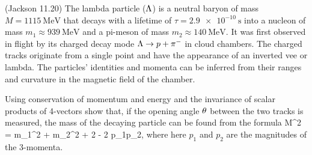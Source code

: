 \newcommand{\mq}{m_1}
\newcommand{\mw}{m_2}
\newcommand{\pq}{p_1}
\newcommand{\pw}{p_2}

\newcommand{\mLam}{\SI{1115}{\MeV}}
\newcommand{\tauLam}{\SI{2.9e-10}{\second}}
\newcommand{\mnuc}{\SI{939}{\MeV}}
\newcommand{\mpi}{\SI{140}{\MeV}}

\begin{statement}{(Jackson 11.20)}
	The lambda particle ($\Lambda$) is a neutral baryon of mass $M = \mLam$ that decays with a lifetime of $\tau = \tauLam$ into a nucleon of mass $\mq \approx \mnuc$ and a pi-meson of mass $\mw \approx \mpi$.  It was first observed in flight by its charged decay mode $\Lambda \to p + \pi^-$ in cloud chambers.  The charged tracks originate from a single point and have the appearance of an inverted vee or lambda.  The particles' identities and momenta can be inferred from their ranges and curvature in the magnetic field of the chamber.
\end{statement}

\newcommand{\Pq}{P_1}
\newcommand{\Pw}{P_2}

\newcommand{\Pmu}{P^\mu}
\newcommand{\Psmu}{P_\mu}
\newcommand{\Pqmu}{{\Pq}^\mu}
\newcommand{\Pqsmu}{{\Pq}_\mu}
\newcommand{\Pwmu}{{\Pw}^\mu}
\newcommand{\Pwsmu}{{\Pw}_\mu}

\newcommand{\vp}{\vb{p}}
\newcommand{\vpq}{\vp_1}
\newcommand{\vpw}{\vp_2}

\begin{problem} \label{4.a}
	Using conservation of momentum and energy and the invariance of scalar products of 4-vectors show that, if the opening angle $\theta$ between the two tracks is measured, the mass of the decaying particle can be found from the formula
	\beq
		M^2 = \mq^2 + \mw^2 + 2 \Eq \Ew - 2 \pq \pw \cos\tht,
	\eeq
	where here $\pq$ and $\pw$ are the magnitudes of the 3-momenta.
\end{problem}

